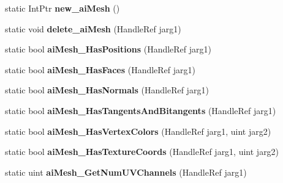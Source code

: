 \begin{DoxyCompactItemize}
\item 
\hypertarget{class_assimp_p_i_n_v_o_k_e_abbe93cd8b9314f1e59e43c6704d50153}{static Int\+Ptr {\bfseries new\+\_\+ai\+Mesh} ()}\label{class_assimp_p_i_n_v_o_k_e_abbe93cd8b9314f1e59e43c6704d50153}

\item 
\hypertarget{class_assimp_p_i_n_v_o_k_e_aa279966ca31da2068f4a81628ab40c64}{static void {\bfseries delete\+\_\+ai\+Mesh} (Handle\+Ref jarg1)}\label{class_assimp_p_i_n_v_o_k_e_aa279966ca31da2068f4a81628ab40c64}

\item 
\hypertarget{class_assimp_p_i_n_v_o_k_e_a76cfd4ede4f0348614c29b9df459e7b4}{static bool {\bfseries ai\+Mesh\+\_\+\+Has\+Positions} (Handle\+Ref jarg1)}\label{class_assimp_p_i_n_v_o_k_e_a76cfd4ede4f0348614c29b9df459e7b4}

\item 
\hypertarget{class_assimp_p_i_n_v_o_k_e_a6b7753bf5d6b3dc4ff997d723abf5eca}{static bool {\bfseries ai\+Mesh\+\_\+\+Has\+Faces} (Handle\+Ref jarg1)}\label{class_assimp_p_i_n_v_o_k_e_a6b7753bf5d6b3dc4ff997d723abf5eca}

\item 
\hypertarget{class_assimp_p_i_n_v_o_k_e_adba1965f98470833827af699f16c2d72}{static bool {\bfseries ai\+Mesh\+\_\+\+Has\+Normals} (Handle\+Ref jarg1)}\label{class_assimp_p_i_n_v_o_k_e_adba1965f98470833827af699f16c2d72}

\item 
\hypertarget{class_assimp_p_i_n_v_o_k_e_a4f588519132cd73e82431b7d54300cf0}{static bool {\bfseries ai\+Mesh\+\_\+\+Has\+Tangents\+And\+Bitangents} (Handle\+Ref jarg1)}\label{class_assimp_p_i_n_v_o_k_e_a4f588519132cd73e82431b7d54300cf0}

\item 
\hypertarget{class_assimp_p_i_n_v_o_k_e_a915befcbb13ab631597eb2f5cd26765c}{static bool {\bfseries ai\+Mesh\+\_\+\+Has\+Vertex\+Colors} (Handle\+Ref jarg1, uint jarg2)}\label{class_assimp_p_i_n_v_o_k_e_a915befcbb13ab631597eb2f5cd26765c}

\item 
\hypertarget{class_assimp_p_i_n_v_o_k_e_a4ad1c72d4c67a656e59cb61c3ce4cb28}{static bool {\bfseries ai\+Mesh\+\_\+\+Has\+Texture\+Coords} (Handle\+Ref jarg1, uint jarg2)}\label{class_assimp_p_i_n_v_o_k_e_a4ad1c72d4c67a656e59cb61c3ce4cb28}

\item 
\hypertarget{class_assimp_p_i_n_v_o_k_e_a6291b75dde09032e7a635711d97bea4f}{static uint {\bfseries ai\+Mesh\+\_\+\+Get\+Num\+U\+V\+Channels} (Handle\+Ref jarg1)}\label{class_assimp_p_i_n_v_o_k_e_a6291b75dde09032e7a635711d97bea4f}


\end{DoxyCompactItemize}
